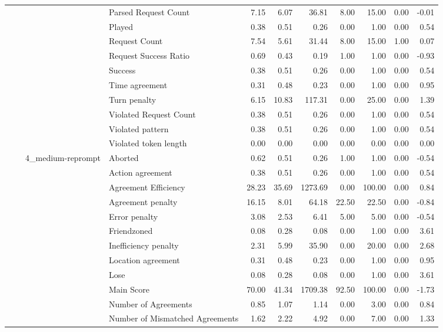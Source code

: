 \begin{tabular}{llllrrrrrrr}
 &  &  & Parsed Request Count & 7.15 & 6.07 & 36.81 & 8.00 & 15.00 & 0.00 & -0.01 \\
 &  &  & Played & 0.38 & 0.51 & 0.26 & 0.00 & 1.00 & 0.00 & 0.54 \\
 &  &  & Request Count & 7.54 & 5.61 & 31.44 & 8.00 & 15.00 & 1.00 & 0.07 \\
 &  &  & Request Success Ratio & 0.69 & 0.43 & 0.19 & 1.00 & 1.00 & 0.00 & -0.93 \\
 &  &  & Success & 0.38 & 0.51 & 0.26 & 0.00 & 1.00 & 0.00 & 0.54 \\
 &  &  & Time agreement & 0.31 & 0.48 & 0.23 & 0.00 & 1.00 & 0.00 & 0.95 \\
 &  &  & Turn penalty & 6.15 & 10.83 & 117.31 & 0.00 & 25.00 & 0.00 & 1.39 \\
 &  &  & Violated Request Count & 0.38 & 0.51 & 0.26 & 0.00 & 1.00 & 0.00 & 0.54 \\
 &  &  & Violated pattern & 0.38 & 0.51 & 0.26 & 0.00 & 1.00 & 0.00 & 0.54 \\
 &  &  & Violated token length & 0.00 & 0.00 & 0.00 & 0.00 & 0.00 & 0.00 & 0.00 \\
\cline{3-11}
 &  & \multirow[t]{27}{*}{4_medium-reprompt} & Aborted & 0.62 & 0.51 & 0.26 & 1.00 & 1.00 & 0.00 & -0.54 \\
 &  &  & Action agreement & 0.38 & 0.51 & 0.26 & 0.00 & 1.00 & 0.00 & 0.54 \\
 &  &  & Agreement Efficiency & 28.23 & 35.69 & 1273.69 & 0.00 & 100.00 & 0.00 & 0.84 \\
 &  &  & Agreement penalty & 16.15 & 8.01 & 64.18 & 22.50 & 22.50 & 0.00 & -0.84 \\
 &  &  & Error penalty & 3.08 & 2.53 & 6.41 & 5.00 & 5.00 & 0.00 & -0.54 \\
 &  &  & Friendzoned & 0.08 & 0.28 & 0.08 & 0.00 & 1.00 & 0.00 & 3.61 \\
 &  &  & Inefficiency penalty & 2.31 & 5.99 & 35.90 & 0.00 & 20.00 & 0.00 & 2.68 \\
 &  &  & Location agreement & 0.31 & 0.48 & 0.23 & 0.00 & 1.00 & 0.00 & 0.95 \\
 &  &  & Lose & 0.08 & 0.28 & 0.08 & 0.00 & 1.00 & 0.00 & 3.61 \\
 &  &  & Main Score & 70.00 & 41.34 & 1709.38 & 92.50 & 100.00 & 0.00 & -1.73 \\
 &  &  & Number of Agreements & 0.85 & 1.07 & 1.14 & 0.00 & 3.00 & 0.00 & 0.84 \\
 &  &  & Number of Mismatched Agreements & 1.62 & 2.22 & 4.92 & 0.00 & 7.00 & 0.00 & 1.33 \\

\end{tabular}
